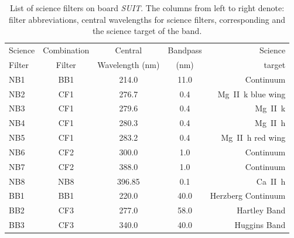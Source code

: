 \documentclass[12pt]{spieman}  %
\newcommand{\suit}{{\it{SUIT}}}
\begin{document}
\begin{table}[ht]
\caption{List of science filters on board \suit. The columns from left to right denote: filter abbreviations, central wavelengths for science filters, corresponding  and the science target of the band.} 
\label{tab:science_filters}
\begin{center}
\begin{tabular}{||l|c|c|c|r||}
\hline
Science  &	Combination &	Central		      & 		Bandpass 		& Science \\
Filter	&	Filter     &	Wavelength  (nm)	&		(nm)		    &	target		\\
\hline
NB1     & BB1 		& 214.0 		    & 11.0 				& Continuum\\
NB2 	& CF1		& 276.7				& 0.4 				& Mg~\rm{II}~k blue wing \\
NB3 	& CF1		& 279.6 			& 0.4 				& Mg~\rm{II}~k\\
NB4 	& CF1		& 280.3				& 0.4 				& Mg~\rm{II}~h\\
NB5		& CF1		& 283.2				& 0.4 				& Mg~\rm{II}~h red wing\\
NB6 	& CF2		& 300.0 			&1.0 				& Continuum\\
NB7 	& CF2		& 388.0				&1.0 				& Continuum\\
NB8		& NB8		& 396.85 			& 0.1 				& Ca~\rm{II}~h\\
BB1 	& BB1		& 220.0				& 40.0 				& Herzberg Continuum \\
BB2 	& CF3		& 277.0 			& 58.0              & Hartley Band\\
BB3 	& CF3		& 340.0				& 40.0              & Huggins Band\\
\hline
\end{tabular}
\end{center}
\end{table}
\end{document}
